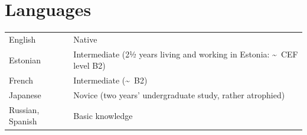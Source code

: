 \documentclass[11pt,a4paper]{article}
\begin{document}
  \vspace{5pt}
  \nocite{%
    chan.r:2026arxiv,%
    vigly.j:2025cogsci,%
    clark.t:2025,%
    clark.t:2025cogsci,%
    vigly.j:2025psyarxiv,%
    lipkin.b:2025,%
    vigly.j:2025HSP,%
    clark.t:2025HSP,%
    hoover.j:2024phd,%
    rahimi.h:2024,%
    hoover.j:2023,%
    socolof.m:2022,%
    hoover.j:2022poster,%
    hoover.j:2021EMNLP,%
    hoover.j:2021WCCFL%
  }
  \AtNextBibliography{\small}
  \printbibliography[heading=none]{}
  \vspace{5pt}


  \section{Languages}

  \begin{longtable}[l]{ll}
    English
    &%
      Native\\
    Estonian 
    &%
      Intermediate (2½ years living and working in Estonia:
      \textasciitilde\ CEF level B2)\\
    French 
    &%
      Intermediate (\textasciitilde\ B2)\\
    Japanese
    &%
      Novice (two years' undergraduate study, rather atrophied)\\
    Russian, Spanish%
    &%
      Basic knowledge\\
  \end{longtable}
\end{document}
